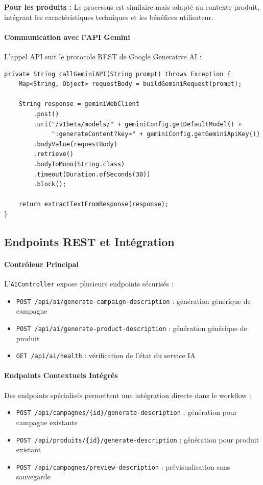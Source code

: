 \textbf{Pour les produits :}
Le processus est similaire mais adapté au contexte produit, intégrant les caractéristiques techniques et les bénéfices utilisateur.

\paragraph{Communication avec l'API Gemini}
L'appel API suit le protocole REST de Google Generative AI :
\begin{verbatim}
private String callGeminiAPI(String prompt) throws Exception {
    Map<String, Object> requestBody = buildGeminiRequest(prompt);

    String response = geminiWebClient
        .post()
        .uri("/v1beta/models/" + geminiConfig.getDefaultModel() +
             ":generateContent?key=" + geminiConfig.getGeminiApiKey())
        .bodyValue(requestBody)
        .retrieve()
        .bodyToMono(String.class)
        .timeout(Duration.ofSeconds(30))
        .block();

    return extractTextFromResponse(response);
}
\end{verbatim}

\subsection{Endpoints REST et Intégration}

\paragraph{Contrôleur Principal}
L'\texttt{AIController} expose plusieurs endpoints sécurisés :

\begin{itemize}[label=\textbullet]
    \item \texttt{POST /api/ai/generate-campaign-description} : génération générique de campagne
    \item \texttt{POST /api/ai/generate-product-description} : génération générique de produit
    \item \texttt{GET /api/ai/health} : vérification de l'état du service IA
\end{itemize}

\paragraph{Endpoints Contextuels Intégrés}
Des endpoints spécialisés permettent une intégration directe dans le workflow :
\begin{itemize}[label=\textbullet]
    \item \texttt{POST /api/campagnes/\{id\}/generate-description} : génération pour campagne existante
    \item \texttt{POST /api/produits/\{id\}/generate-description} : génération pour produit existant
    \item \texttt{POST /api/campagnes/preview-description} : prévisualisation sans sauvegarde
\end{itemize}

